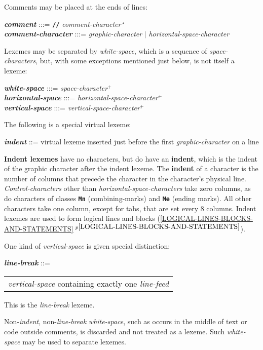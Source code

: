 \documentclass[12pt]{article}
\newcommand{\TT}[1]{{\tt \bfseries #1}}
\newcommand{\PLUS}[1][]{{$^{+#1}$}}
\newcommand{\key}[1]{{\rm \bfseries #1}}
\newcommand{\emkey}[1]{{\em \bfseries #1}}
\newcommand{\itemref}[1]{\ref{#1}$\,^{p\pageref{#1}}$}
\newenvironment{indpar}[1][0.3in]%
	{\begin{list}{}%
		     {\setlength{\itemsep}{0in}%
		      \setlength{\topsep}{0in}%
		      \setlength{\parsep}{1ex}%
		      \setlength{\labelwidth}{#1}%
		      \setlength{\leftmargin}{#1}%
		      \addtolength{\leftmargin}{\labelsep}}%
	 \item}%
	{\end{list}}
\begin{document}
Comments may be placed at the ends of lines:
\begin{indpar}
\emkey{comment}\label{COMMENT} :::=
    \TT{//} {\em comment-character}\,$^\star$
\\[1ex]
\emkey{comment-character} :::= {\em graphic-character}
                          $|$ {\em horizontal-space-character}
\end{indpar}

Lexemes may be separated by {\em white-space}, which
is a sequence of {\em space-characters},
but, with some exceptions mentioned just below, is not itself a lexeme:
\begin{indpar}
\emkey{white-space} :::= {\em space-character}\PLUS{}
\\[0.3ex]
\emkey{horizontal-space} :::= {\em horizontal-space-character}\PLUS{}
\\[0.3ex]
\emkey{vertical-space} :::= {\em vertical-space-character}\PLUS{}
\end{indpar}

The following is a special virtual lexeme:
\begin{indpar}
\emkey{indent}\label{INDENT} ::=
        virtual lexeme inserted just before the first
	{\em graphic-character} on a line
\end{indpar}

\key{Indent lexemes} have no characters, but
do have an \key{indent}, which is the indent of
the graphic character after the indent lexeme.
The \key{indent} of a character is the number
of columns that precede the character in the character's physical line.
{\em Control-characters} other than {\em horizontal-space-characters}
take zero columns, as do characters of classes \TT{Mn} (combining-marks)
and \TT{Me} (ending marks).  All other characters take one column,
except for tabs, that are set every 8 columns.
Indent lexemes are used to form logical lines and blocks
(\itemref{LOGICAL-LINES-BLOCKS-AND-STATEMENTS}).

One kind of {\em vertical-space} is given special distinction:
\begin{indpar}
\emkey{line-break}\label{LINE-BREAK} ::=
	\begin{tabular}[t]{l}
        {\em vertical-space} containing exactly one {\em line-feed}
	\end{tabular}
\end{indpar}

This is the {\em line-break} lexeme.

Non-{\em indent}, non-{\em line-break} {\em white-space}, such as occurs
in the middle of text or code outside comments, is discarded and not treated
as a lexeme.  Such {\em white-space} may be used to separate lexemes.
\end{document}
